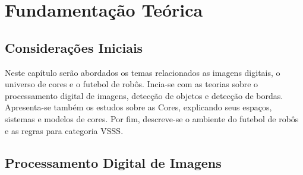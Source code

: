 \graphicspath{{figuras/}}
\chapter{Fundamentação Teórica} \label{Cap:Fundamentacao}
\section{Considerações Iniciais}
Neste capítulo serão abordados os temas relacionados as imagens digitais, o universo de cores e o futebol de robôs. Incia-se com as teorias sobre o processamento digital de imagens, detecção de objetos e detecção de bordas. Apresenta-se também os estudos sobre as Cores, explicando seus espaços, sistemas e modelos de cores. Por fim, descreve-se o ambiente do futebol de robôs e as regras para categoria VSSS.


\section{Processamento Digital de Imagens}

